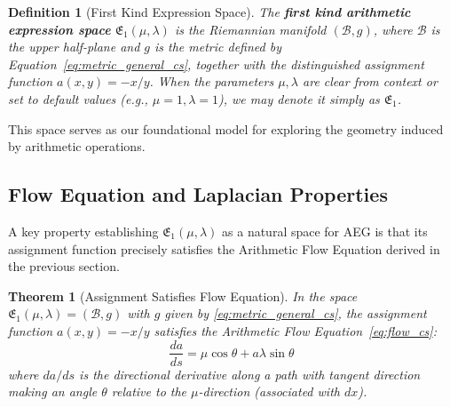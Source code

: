 \documentclass[12pt]{article}
\newtheorem{definition}{Definition}[section]
\newtheorem{theorem}{Theorem}[section]
\begin{document}
\begin{definition}[First Kind Expression Space]\label{def:E1_space_cs}
The \textbf{first kind arithmetic expression space} \( \mathfrak{E}_1(\mu, \lambda) \) is the Riemannian manifold \( (\mathcal{B}, g) \), where \( \mathcal{B} \) is the upper half-plane and \( g \) is the metric defined by Equation~\eqref{eq:metric_general_cs}, together with the distinguished assignment function \( a(x,y) = -x/y \). When the parameters \( \mu, \lambda \) are clear from context or set to default values (e.g., \( \mu=1, \lambda=1 \)), we may denote it simply as \( \mathfrak{E}_1 \).
\end{definition}

This space serves as our foundational model for exploring the geometry induced by arithmetic operations.

\subsection{Flow Equation and Laplacian Properties} %

A key property establishing \( \mathfrak{E}_1(\mu, \lambda) \) as a natural space for AEG is that its assignment function precisely satisfies the Arithmetic Flow Equation derived in the previous section.

\begin{theorem}[Assignment Satisfies Flow Equation]\label{thm:generalE1_cs}
In the space \( \mathfrak{E}_1(\mu, \lambda) = (\mathcal{B}, g) \) with \( g \) given by \eqref{eq:metric_general_cs}, the assignment function \( a(x,y) = -x/y \) satisfies the Arithmetic Flow Equation~\eqref{eq:flow_cs}:
\[
\frac{da}{ds} = \mu \cos \theta + a \lambda \sin \theta
\]
where \( da/ds \) is the directional derivative along a path with tangent direction making an angle \( \theta \) relative to the \( \mu \)-direction (associated with \( dx \)).
\end{theorem}
\end{document}
